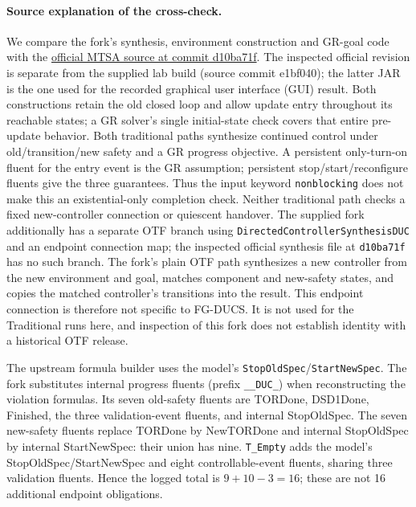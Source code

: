 \documentclass[11pt]{article}
\begin{document}
\paragraph{Source explanation of the cross-check.}
We compare the fork's synthesis, environment construction and GR-goal code with the
\href{https://git.exactas.uba.ar/lafhis/mtsa/-/tree/d10ba71f092dc9645a80d2752bd089691f158156/maven-root/mtsa/src/main/java/ltsa/updatingControllers}{official MTSA source at commit d10ba71f}.
The inspected official revision is separate from the supplied lab build (source commit e1bf040); the latter JAR is the one used for the recorded graphical user interface (GUI) result.
Both constructions retain the old closed loop and allow update entry throughout its reachable states; a GR solver's single initial-state check covers that entire pre-update behavior. Both traditional paths synthesize continued control under old/transition/new safety and a GR progress objective. A persistent only-turn-on fluent for the entry event is the GR assumption; persistent stop/start/reconfigure fluents give the three guarantees. Thus the input keyword \texttt{nonblocking} does not make this an existential-only completion check. Neither traditional path checks a fixed new-controller connection or quiescent handover. The supplied fork additionally has a separate OTF branch using \texttt{DirectedController\allowbreak SynthesisDUC} and an endpoint connection map; the inspected official synthesis file at \texttt{d10ba71f} has no such branch. The fork's plain OTF path synthesizes a new controller from the new environment and goal, matches component and new-safety states, and copies the matched controller's transitions into the result. This endpoint connection is therefore not specific to FG-DUCS. It is not used for the Traditional runs here, and inspection of this fork does not establish identity with a historical OTF release.

The upstream formula builder uses the model's \texttt{StopOldSpec}/\texttt{StartNewSpec}. The fork substitutes internal progress fluents (prefix \texttt{\_\_DUC\_}) when reconstructing the violation formulas. Its seven old-safety fluents are TORDone, DSD1Done, Finished, the three validation-event fluents, and internal StopOldSpec. The seven new-safety fluents replace TORDone by NewTORDone and internal StopOldSpec by internal StartNewSpec: their union has nine. \texttt{T\_Empty} adds the model's StopOldSpec/StartNewSpec and eight controllable-event fluents, sharing three validation fluents. Hence the logged total is $9+10-3=16$; these are not 16 additional endpoint obligations.
\end{document}
